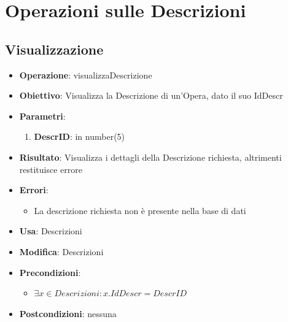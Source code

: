 \section{Operazioni sulle Descrizioni}

\subsection{Visualizzazione}
\begin{itemize}
	\item \textbf{Operazione}: visualizzaDescrizione
	\item \textbf{Obiettivo}: Visualizza la Descrizione di un'Opera, dato il suo IdDescr
	\item \textbf{Parametri}:
	\begin{enumerate}
		\item \textbf{DescrID}: in number(5)
	\end{enumerate}
	\item \textbf{Risultato}: Visualizza i dettagli della Descrizione richiesta, altrimenti restituisce errore
	\item \textbf{Errori}: 
	\begin{itemize}
		\item La descrizione richiesta non è presente nella base di dati
	\end{itemize}
	\item \textbf{Usa}: Descrizioni
	\item \textbf{Modifica}: Descrizioni
	\item \textbf{Precondizioni}:
	\begin{itemize}
		\item $\exists x \in Descrizioni : x.IdDescr = DescrID$
	\end{itemize}
	\item \textbf{Postcondizioni}: nessuna
\end{itemize}

